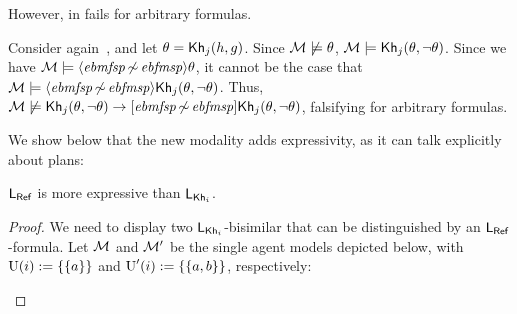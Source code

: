 \begin{textonuevo}
However,  in  fails for arbitrary formulas.

\medskip

\begin{example}
Consider again~, and let $\theta = {\sf Kh}_j(h,g)$. Since $\mathcal{M} \not\models \theta$, $\mathcal{M} \models {\sf Kh}_j(\theta,\neg \theta)$. Since we have $\mathcal{M}\models\langle \mathit{ebmfsp}{\,\not\sim\,}\mathit{ebfmsp} \rangle\theta$, it cannot be the case that  $\mathcal{M} \models \langle \mathit{ebmfsp}{\,\not\sim\,}\mathit{ebfmsp} \rangle{\sf Kh}_j(\theta,\neg \theta)$. Thus, $\mathcal{M} \not\models {\sf Kh}_j(\theta,\neg \theta) \rightarrow [{\mathit{ebmfsp}{\,\not\sim\,}\mathit{ebfmsp}}]{\sf Kh}_j(\theta,\neg \theta)$, falsifying  for arbitrary formulas.
\end{example}

\medskip

We show below that the new modality adds expressivity, as it can talk explicitly about plans:

\medskip

\begin{proposition}\label{prop:expref}
$\mathsf{L_{Ref}}$ is more expressive than $\mathsf{L}_{{\sf Kh}_i}$.
\end{proposition}
\begin{proof}
We need to display two $\mathsf{L}_{{\sf Kh}_i}$-bisimilar \ultss that can be distinguished by an $\mathsf{L_{Ref}}$-formula.
Let $\mathcal{M}$ and $\mathcal{M}'$ be the single agent models depicted below, with $\operatorname{U}(i):=\{ \{ a \} \}$ and $\operatorname{U}'(i):=\{ \{ a,b \} \}$, respectively:
\begin{center}
\hspace{2cm}
\end{center}


\end{proof}
\end{textonuevo}
